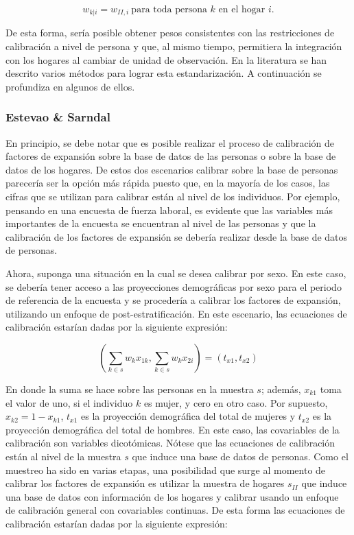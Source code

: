 \documentclass[
  12pt,
  spanish,
]{book}
\begin{document}
\[
w_{k|i}=w_{II,i}\ \text{para toda persona $k$ en el hogar $i$}.
\]

De esta forma, sería posible obtener pesos consistentes con las restricciones de calibración a nivel de persona y que, al mismo tiempo, permitiera la integración con los hogares al cambiar de unidad de observación. En la literatura se han descrito varios métodos para lograr esta estandarización. A continuación se profundiza en algunos de ellos.

\hypertarget{estevao-sarndal}{%
\subsubsection*{Estevao \& Sarndal}\label{estevao-sarndal}}

En principio, se debe notar que es posible realizar el proceso de calibración de factores de expansión sobre la base de datos de las personas o sobre la base de datos de los hogares. De estos dos escenarios calibrar sobre la base de personas parecería ser la opción más rápida puesto que, en la mayoría de los casos, las cifras que se utilizan para calibrar están al nivel de los individuos. Por ejemplo, pensando en una encuesta de fuerza laboral, es evidente que las variables más importantes de la encuesta se encuentran al nivel de las personas y que la calibración de los factores de expansión se debería realizar desde la base de datos de personas.

Ahora, suponga una situación en la cual se desea calibrar por sexo. En este caso, se debería tener acceso a las proyecciones demográficas por sexo para el periodo de referencia de la encuesta y se procedería a calibrar los factores de expansión, utilizando un enfoque de post-estratificación. En este escenario, las ecuaciones de calibración estarían dadas por la siguiente expresión:

\[
\left ( \sum_{k \in s} w_k x_{1k}, \sum_{k \in s} w_k x_{2i} \right )=(t_{x1}, t_{x2})
\]

En donde la suma se hace sobre las personas en la muestra \(s\); además, \(x_{k1}\) toma el valor de uno, si el individuo \(k\) es mujer, y cero en otro caso. Por supuesto, \(x_{k2} = 1 - x_{k1}\), \(t_{x1}\) es la proyección demográfica del total de mujeres y \(t_{x2}\) es la proyección demográfica del total de hombres. En este caso, las covariables de la calibración son variables dicotómicas. Nótese que las ecuaciones de calibración están al nivel de la muestra \(s\) que induce una base de datos de personas. Como el muestreo ha sido en varias etapas, una posibilidad que surge al momento de calibrar los factores de expansión es utilizar la muestra de hogares \(s_{II}\) que induce una base de datos con información de los hogares y calibrar usando un enfoque de calibración general con covariables continuas. De esta forma las ecuaciones de calibración estarían dadas por la siguiente expresión:
\end{document}
